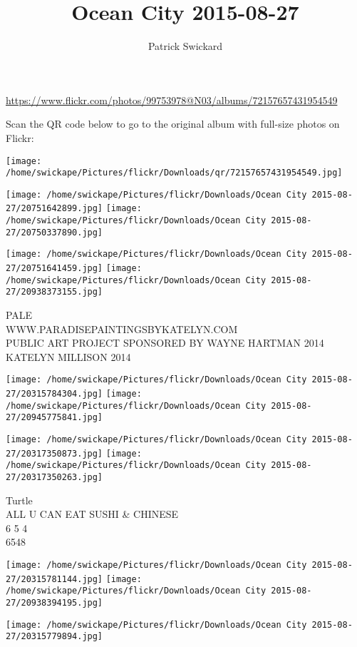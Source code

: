 \documentclass[10pt,letterpaper]{article}
\title{Ocean City 2015-08-27}
\author{Patrick Swickard}
\date{}
\begin{document}
\maketitle

\url{https://www.flickr.com/photos/99753978@N03/albums/72157657431954549}

Scan the QR code below to go to the original album with full-size photos on Flickr:

\texttt{[image: /home/swickape/Pictures/flickr/Downloads/qr/72157657431954549.jpg]}
\pagebreak

\texttt{[image: /home/swickape/Pictures/flickr/Downloads/Ocean City 2015-08-27/20751642899.jpg]}
\texttt{[image: /home/swickape/Pictures/flickr/Downloads/Ocean City 2015-08-27/20750337890.jpg]}

\texttt{[image: /home/swickape/Pictures/flickr/Downloads/Ocean City 2015-08-27/20751641459.jpg]}
\texttt{[image: /home/swickape/Pictures/flickr/Downloads/Ocean City 2015-08-27/20938373155.jpg]}

PALE\\
WWW.PARADISEPAINTINGSBYKATELYN.COM\\
PUBLIC ART PROJECT SPONSORED BY WAYNE HARTMAN 2014\\
KATELYN MILLISON 2014
\pagebreak

\texttt{[image: /home/swickape/Pictures/flickr/Downloads/Ocean City 2015-08-27/20315784304.jpg]}
\texttt{[image: /home/swickape/Pictures/flickr/Downloads/Ocean City 2015-08-27/20945775841.jpg]}

\texttt{[image: /home/swickape/Pictures/flickr/Downloads/Ocean City 2015-08-27/20317350873.jpg]}
\texttt{[image: /home/swickape/Pictures/flickr/Downloads/Ocean City 2015-08-27/20317350263.jpg]}

Turtle\\
ALL U CAN EAT SUSHI \& CHINESE\\
6 5 4\\
6548
\pagebreak

\texttt{[image: /home/swickape/Pictures/flickr/Downloads/Ocean City 2015-08-27/20315781144.jpg]}
\texttt{[image: /home/swickape/Pictures/flickr/Downloads/Ocean City 2015-08-27/20938394195.jpg]}

\vspace{0.25in}
\texttt{[image: /home/swickape/Pictures/flickr/Downloads/Ocean City 2015-08-27/20315779894.jpg]}
\end{document}
